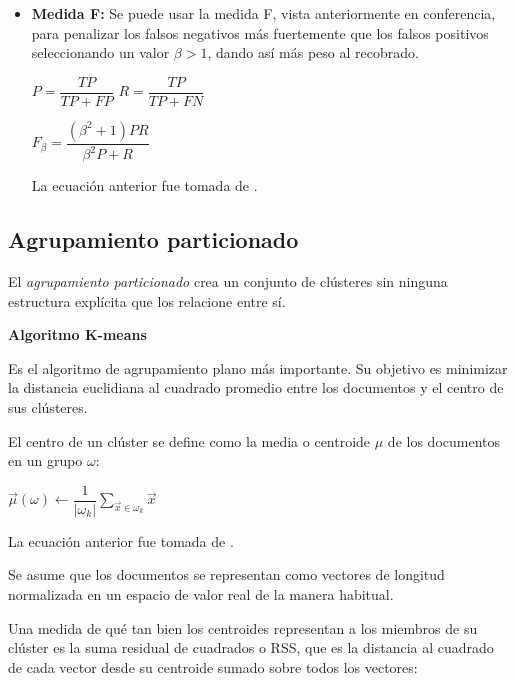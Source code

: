 \documentclass{llncs}
\begin{document}
\begin{itemize}
	\vspace{1em}
	\item \textbf{Medida F:} Se puede usar la medida F, vista anteriormente en conferencia, para penalizar los falsos negativos más fuertemente que los falsos positivos seleccionando un valor $ \beta > 1 $, dando así más peso al recobrado.
	\begin{center}
		$ P = \dfrac{TP}{TP + FP}  $ \hspace{2em}
		$ R = \dfrac{TP}{TP + FN} $
		
		\vspace{1em}
		$ F_{\beta} = \dfrac{(\beta^{2} + 1)PR}{\beta^{2}P + R} $
	\end{center}
	La ecuaci\'on anterior fue tomada de \cite[Secci\'on 8.3, p.154]{B1}.
\end{itemize}

\subsection{Agrupamiento particionado}

El \textit{agrupamiento particionado} crea un conjunto  de clústeres sin ninguna estructura explícita que los relacione entre sí. 

\vspace{1em}
\textbf{Algoritmo K-means}
\vspace{0.5em}

	Es el algoritmo de agrupamiento plano más importante. Su objetivo es minimizar la distancia euclidiana al cuadrado promedio entre los documentos y el centro de sus cl\'usteres. 
	
	El centro de un cl\'uster se define como la media o centroide $\mu$ de los documentos en un grupo $\omega$:
	
	\begin{center}
		$ \overrightarrow{\mu}(\omega) \leftarrow \dfrac{1}{|\omega_{k}|} \sum_{\overrightarrow{x} \in \omega_{k}} \overrightarrow{x} $
	\end{center}
	
	La ecuaci\'on anterior fue tomada de \cite[Cap\'itulo 6, p.131]{B1}.
	
	Se asume que los documentos se representan como vectores de longitud normalizada  en un espacio de valor real de la manera habitual.  
	
	Una medida de qué tan bien los centroides representan a los miembros de su cl\'uster es la suma residual de cuadrados o RSS, que es la distancia al cuadrado de cada vector desde su centroide sumado sobre todos los vectores:
	
\end{document}
